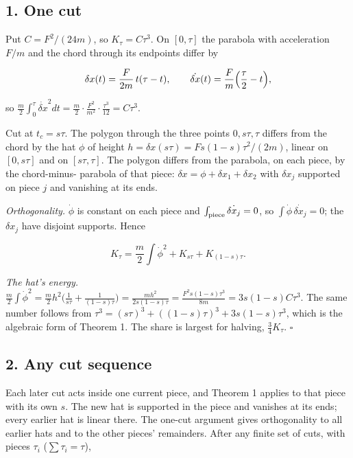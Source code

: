 \documentclass[11pt,a4paper]{article}
\begin{document}
\hypertarget{one-cut}{%
\subsection{1. One cut}\label{one-cut}}

Put \(C=F^2/(24m)\), so \(K_\tau=C\tau^3\). On \([0,\tau]\) the parabola
with acceleration \(F/m\) and the chord through its endpoints differ by

\[\delta x(t)=\frac F{2m}\,t(\tau-t),\qquad
\dot{\delta x}(t)=\frac Fm\Bigl(\frac\tau2-t\Bigr),\]

so
\(\frac m2\int_0^\tau\dot{\delta x}^2dt=\frac m2\cdot\frac{F^2}{m^2}\cdot\frac{\tau^3}{12}=C\tau^3\).

Cut at \(t_c=s\tau\). The polygon through the three points
\(0,s\tau,\tau\) differs from the chord by the hat \(\phi\) of height
\(h=\delta x(s\tau)=Fs(1-s)\tau^2/(2m)\), linear on \([0,s\tau]\) and on
\([s\tau,\tau]\). The polygon differs from the parabola, on each piece,
by the chord-minus- parabola of that piece:
\(\delta x=\phi+\delta x_1+\delta x_2\) with \(\delta x_j\) supported on
piece \(j\) and vanishing at its ends.

\emph{Orthogonality.} \(\dot\phi\) is constant on each piece and
\(\int_{\rm piece}\dot{\delta x_j}=0\), so
\(\int\dot\phi\,\dot{\delta x_j}=0\); the \(\delta x_j\) have disjoint
supports. Hence

\[K_\tau=\frac m2\int\dot\phi^2+K_{s\tau}+K_{(1-s)\tau}.\]

\emph{The hat's energy.}
\(\frac m2\int\dot\phi^2=\frac m2h^2\bigl(\frac1{s\tau}+\frac1{(1-s)\tau}\bigr) =\frac{mh^2}{2s(1-s)\tau}=\frac{F^2s(1-s)\tau^3}{8m}=3s(1-s)C\tau^3.\)
The same number follows from
\(\tau^3=(s\tau)^3+((1-s)\tau)^3+3s(1-s)\tau^3\), which is the algebraic
form of Theorem 1. The share is largest for halving, \(\frac34K_\tau\).
\(\square\)

\hypertarget{any-cut-sequence}{%
\subsection{2. Any cut sequence}\label{any-cut-sequence}}

Each later cut acts inside one current piece, and Theorem 1 applies to
that piece with its own \(s\). The new hat is supported in the piece and
vanishes at its ends; every earlier hat is linear there. The one-cut
argument gives orthogonality to all earlier hats and to the other
pieces' remainders. After any finite set of cuts, with pieces \(\tau_i\)
(\(\sum\tau_i=\tau\)),
\end{document}
